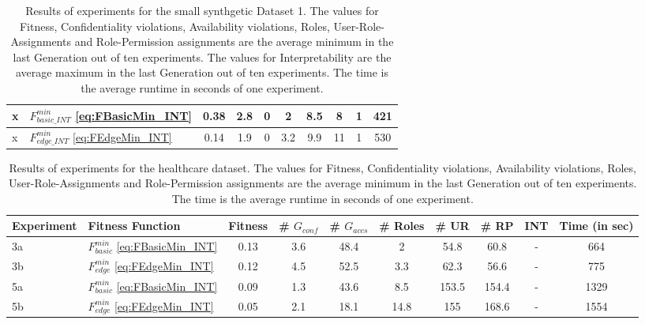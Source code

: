 \begin{landscape}
\begin{table}
\begin{tabular}{|l|l|c|c|c|c|c|c|c|c|}
            x & $F_{basic\_INT}^{min}$ \eqref{eq:FBasicMin_INT}   &   0.38  &   2.8   &   0   &   2   &   8.5   &   8   &   1   &   421\\ \hline
            x & $F_{edge\_INT}^{min}$ \eqref{eq:FEdgeMin_INT}   &   0.14   &   1.9   &   0   &   3.2   &   9.9   &   11   &   1   &   530\\ \hline
        \end{tabular}
        \caption{Results of experiments for the small synthgetic Dataset 1. The values for Fitness, Confidentiality violations, Availability violations, Roles, User-Role-Assignments and Role-Permission assignments are the average minimum in the last Generation out of ten experiments. The values for Interpretability are the average maximum in the last Generation out of ten experiments. The time is the average runtime in seconds of one experiment.}
        \label{tab:results_exp2_dataset1}
    \end{table}
    \begin{table}
        \centering
        \begin{tabular}{|l|l|c|c|c|c|c|c|c|c|}
            \hline
            \rowcolor{myGray} 
            \textbf{Experiment} & \textbf{Fitness Function} & \textbf{Fitness} & \textbf{\# $G_{conf}$} & \textbf{\# $G_{accs}$} & \textbf{\# Roles} & \textbf{\# UR} & \textbf{\# RP} & \textbf{INT} & \textbf{Time (in sec)}\\ \hline
            3a & $F_{basic}^{min}$ \eqref{eq:FBasicMin_INT}   &   0.13   &   3.6   &   48.4   &   2   &   54.8   &   60.8   &   -   & 664\\ \hline
            3b & $F_{edge}^{min}$ \eqref{eq:FEdgeMin_INT}   &   0.12   &   4.5   &   52.5   &   3.3   &   62.3   &   56.6   &   -   & 775\\ \hline
            5a & $F_{basic}^{min}$ \eqref{eq:FBasicMin_INT}   &   0.09   &   1.3   &   43.6   &   8.5   &   153.5   &   154.4   &   -   & 1329\\ \hline
            5b & $F_{edge}^{min}$ \eqref{eq:FEdgeMin_INT}   &   0.05   &   2.1   &   18.1   &   14.8   &   155   &   168.6   &   -   & 1554\\ \hline
        \end{tabular}
        \caption{Results of experiments for the healthcare dataset. The values for Fitness, Confidentiality violations, Availability violations, Roles, User-Role-Assignments and Role-Permission assignments are the average minimum in the last Generation out of ten experiments. The time is the average runtime in seconds of one experiment.}
        \label{tab:results_exp2_healthcare}
    \end{table}
\end{landscape}